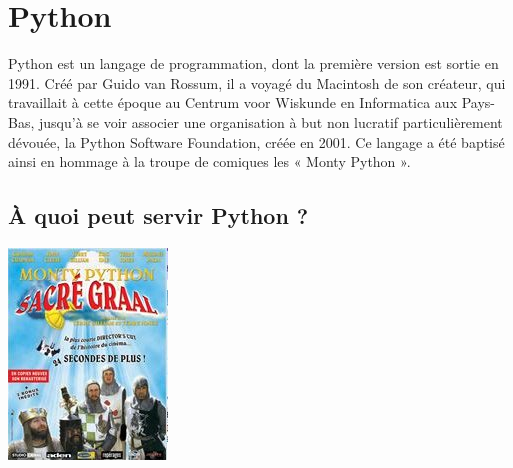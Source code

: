 \documentclass[11pt,oneside]{article}
\begin{document}
\section{Python}


\begin{minipage}[c]{.79\linewidth}

Python est un langage de programmation, dont la première version est sortie en 1991. Créé par Guido van Rossum, il a voyagé du Macintosh de son créateur, qui travaillait à cette époque au Centrum voor Wiskunde en Informatica aux Pays-Bas, jusqu'à se voir associer une organisation à but non lucratif particulièrement dévouée, la Python Software Foundation, créée en 2001. Ce langage a été baptisé ainsi en hommage à la troupe de comiques les « Monty Python ».

\subsection{À quoi peut servir Python ?}
\end{minipage} \hfill
\begin{minipage}[c]{.2\linewidth}
\begin{center}
\includegraphics[width=.99\textwidth]{images/monty.jpg}
\end{center}
\end{minipage}
\end{document}
